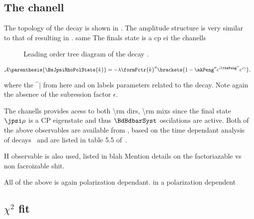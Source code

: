 

\subsection{The \BsJpsiRho chanell}
The topology of the \BsJpsiRho decay is shown in . The amplitude structure is very similar to that
of \BsJpsiKst resulting in . same The finals state is a cp ei the chanells

\begin{figure}[h]
  \centering
  {\sffamily }
  \caption{Leading order tree diagram of the decay \BsJpsiRho.}
  \label{bs2jpsikst_penguin}
\end{figure}

\begin{equation}
  \mathcal{A} \parenthesis{\BsJpsiRhoPolState{k}} = -\lambda \formFctr{k}'' \brackets{ 1 - \akPeng'' e^{i\thkPeng''} e^{i\gamma} },
  \label{bsjpsirho_amp}
\end{equation}

\noindent where the ${}^{\prime\prime}|$ from here and on labels parameters related to the \BsJpsiRho decay. Note again
the absence of the subression factor $\epsilon$.

The \BsJpsiRho chanells provides acess to both \Acp{\rm dir}, \Acp{\rm mix} since the final state $\jpsi\rho$ is a CP eigenstate
and thus $\BdBdbarSyst$ oscilations are active. Both of the above observables are available from \lhcb, based on the
time dependant analysis of \BdJpsiRho decays~\cite{Aaij:2014vda} and are listed in table 5.5 of~\cite{DeBruyn-thesis}.

H observable is also used, listed in blah
Mention details on the factoriazable vs non facroizable shit.

All of the above is again polarization dependant. in a polarization dependent


\subsection{$\chi^2$ fit}
\label{penguin_chi2_fit}

